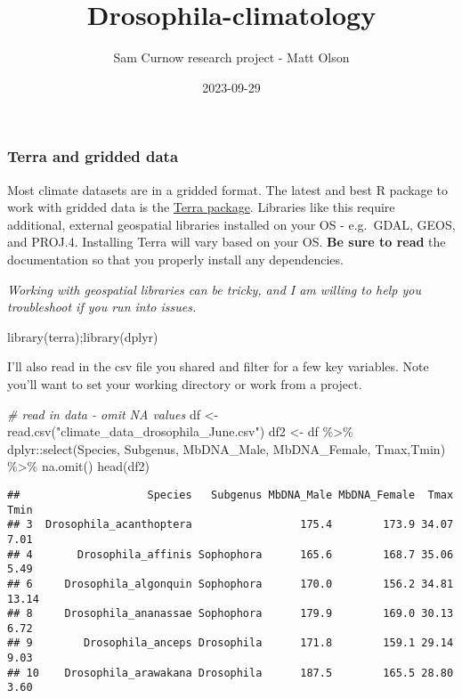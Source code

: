\documentclass[
]{article}
\title{Drosophila-climatology}
\author{Sam Curnow research project - Matt Olson}
\date{2023-09-29}
\newenvironment{Shaded}{\begin{snugshade}}{\end{snugshade}}
\newcommand{\CommentTok}[1]{\textcolor[rgb]{0.56,0.35,0.01}{\textit{#1}}}
\newcommand{\FunctionTok}[1]{\textcolor[rgb]{0.00,0.00,0.00}{#1}}
\newcommand{\NormalTok}[1]{#1}
\newcommand{\OtherTok}[1]{\textcolor[rgb]{0.56,0.35,0.01}{#1}}
\newcommand{\SpecialCharTok}[1]{\textcolor[rgb]{0.00,0.00,0.00}{#1}}
\newcommand{\StringTok}[1]{\textcolor[rgb]{0.31,0.60,0.02}{#1}}
\begin{document}
\maketitle

\hypertarget{terra-and-gridded-data}{%
\subsubsection{Terra and gridded data}\label{terra-and-gridded-data}}

Most climate datasets are in a gridded format. The latest and best R
package to work with gridded data is the
\href{https://rspatial.github.io/terra/}{Terra package}. Libraries like
this require additional, external geospatial libraries installed on your
OS - e.g.~GDAL, GEOS, and PROJ.4. Installing Terra will vary based on
your OS. \textbf{Be sure to read} the documentation so that you properly
install any dependencies.

\emph{Working with geospatial libraries can be tricky, and I am willing
to help you troubleshoot if you run into issues.}

\begin{Shaded}
\begin{Highlighting}[]
\FunctionTok{library}\NormalTok{(terra);}\FunctionTok{library}\NormalTok{(dplyr)}
\end{Highlighting}
\end{Shaded}

I'll also read in the csv file you shared and filter for a few key
variables. Note you'll want to set your working directory or work from a
project.

\begin{Shaded}
\begin{Highlighting}[]
\CommentTok{\# read in data {-} omit NA values}
\NormalTok{df }\OtherTok{\textless{}{-}} \FunctionTok{read.csv}\NormalTok{(}\StringTok{"climate\_data\_drosophila\_June.csv"}\NormalTok{)}
\NormalTok{df2 }\OtherTok{\textless{}{-}}\NormalTok{ df }\SpecialCharTok{\%\textgreater{}\%}\NormalTok{ dplyr}\SpecialCharTok{::}\FunctionTok{select}\NormalTok{(Species, Subgenus, MbDNA\_Male, MbDNA\_Female, Tmax,Tmin) }\SpecialCharTok{\%\textgreater{}\%} \FunctionTok{na.omit}\NormalTok{()}
\FunctionTok{head}\NormalTok{(df2)}
\end{Highlighting}
\end{Shaded}

\begin{verbatim}
##                    Species   Subgenus MbDNA_Male MbDNA_Female  Tmax  Tmin
## 3  Drosophila_acanthoptera                 175.4        173.9 34.07  7.01
## 4       Drosophila_affinis Sophophora      165.6        168.7 35.06  5.49
## 6     Drosophila_algonquin Sophophora      170.0        156.2 34.81 13.14
## 8     Drosophila_ananassae Sophophora      179.9        169.0 30.13  6.72
## 9        Drosophila_anceps Drosophila      171.8        159.1 29.14  9.03
## 10    Drosophila_arawakana Drosophila      187.5        165.5 28.80  3.60
\end{verbatim}
\end{document}
